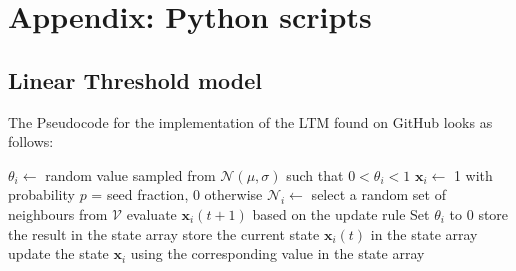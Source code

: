 \documentclass[11pt]{article}
\begin{document}
	\section{Appendix: Python scripts} \label{app:Scripts}
	\subsection{Linear Threshold model}
	The Pseudocode for the implementation of the LTM found on GitHub looks as follows:
	
	\begin{algorithm}[H]
		\caption{The Linear Threshold Model} \label{alg:LTM}
		\begin{algorithmic}
			\State $\theta_i \gets$ random value sampled from $\mathcal{N}(\mu, \sigma)$ such that $0<\theta_i<1$
			\State $\mathbf{x}_i \gets$ 1 with probability $p$ = seed fraction, 0 otherwise
			\State $\mathcal{N}_i \gets$ select a random set of neighbours from $\mathcal{V}$
			\EndFor
			\State
			\State evaluate $\mathbf{x}_i(t+1)$ based on the update rule
				\State Set $\theta_i$ to 0
			\EndIf
			\State store the result in the state array
			\Else
			\State store the current state $\mathbf{x}_i(t)$ in the state array
			\EndIf
			\EndFor
			\State update the state $\mathbf{x}_i$ using the corresponding value in the state array
			\EndFor
			\EndWhile
		\end{algorithmic}
	\end{algorithm}
	
	
	\newpage
	\printbibliography
\end{document}
